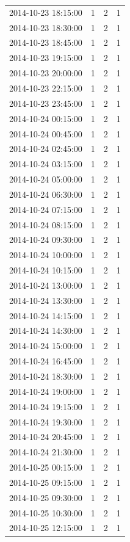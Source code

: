 \begin{tabular}{lrrr}
2014-10-23 18:15:00 & 1 & 2 & 1 \\
2014-10-23 18:30:00 & 1 & 2 & 1 \\
2014-10-23 18:45:00 & 1 & 2 & 1 \\
2014-10-23 19:15:00 & 1 & 2 & 1 \\
2014-10-23 20:00:00 & 1 & 2 & 1 \\
2014-10-23 22:15:00 & 1 & 2 & 1 \\
2014-10-23 23:45:00 & 1 & 2 & 1 \\
2014-10-24 00:15:00 & 1 & 2 & 1 \\
2014-10-24 00:45:00 & 1 & 2 & 1 \\
2014-10-24 02:45:00 & 1 & 2 & 1 \\
2014-10-24 03:15:00 & 1 & 2 & 1 \\
2014-10-24 05:00:00 & 1 & 2 & 1 \\
2014-10-24 06:30:00 & 1 & 2 & 1 \\
2014-10-24 07:15:00 & 1 & 2 & 1 \\
2014-10-24 08:15:00 & 1 & 2 & 1 \\
2014-10-24 09:30:00 & 1 & 2 & 1 \\
2014-10-24 10:00:00 & 1 & 2 & 1 \\
2014-10-24 10:15:00 & 1 & 2 & 1 \\
2014-10-24 13:00:00 & 1 & 2 & 1 \\
2014-10-24 13:30:00 & 1 & 2 & 1 \\
2014-10-24 14:15:00 & 1 & 2 & 1 \\
2014-10-24 14:30:00 & 1 & 2 & 1 \\
2014-10-24 15:00:00 & 1 & 2 & 1 \\
2014-10-24 16:45:00 & 1 & 2 & 1 \\
2014-10-24 18:30:00 & 1 & 2 & 1 \\
2014-10-24 19:00:00 & 1 & 2 & 1 \\
2014-10-24 19:15:00 & 1 & 2 & 1 \\
2014-10-24 19:30:00 & 1 & 2 & 1 \\
2014-10-24 20:45:00 & 1 & 2 & 1 \\
2014-10-24 21:30:00 & 1 & 2 & 1 \\
2014-10-25 00:15:00 & 1 & 2 & 1 \\
2014-10-25 09:15:00 & 1 & 2 & 1 \\
2014-10-25 09:30:00 & 1 & 2 & 1 \\
2014-10-25 10:30:00 & 1 & 2 & 1 \\
2014-10-25 12:15:00 & 1 & 2 & 1 \\

\end{tabular}
